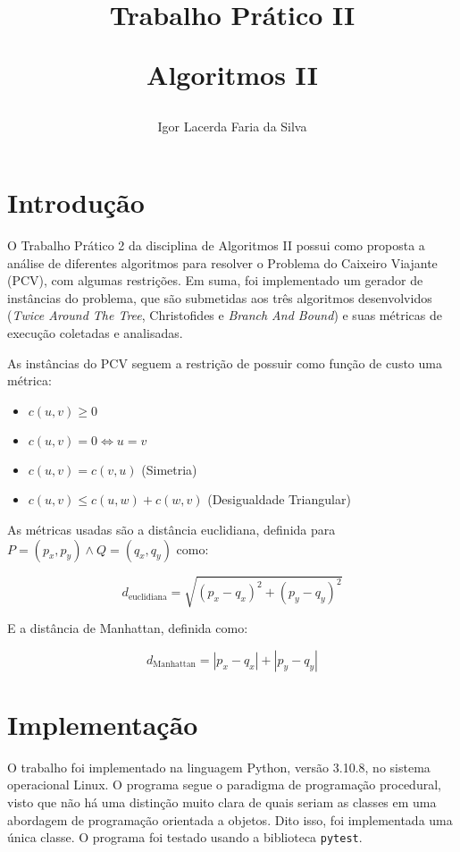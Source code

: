 \documentclass{article}
\author{Igor Lacerda Faria da Silva}
\title{Trabalho Prático II

Algoritmos II}
\date{}
\begin{document}
\maketitle

\section{Introdução}

O Trabalho Prático 2 da disciplina de Algoritmos II possui como proposta a análise de diferentes algoritmos para resolver o Problema do Caixeiro Viajante (PCV), com algumas restrições. Em suma, foi implementado um gerador de instâncias do problema, que são submetidas aos três algoritmos desenvolvidos (\textit{Twice Around The Tree}, Christofides e \textit{Branch And Bound}) e suas métricas de execução coletadas e analisadas.

As instâncias do PCV seguem a restrição de possuir como função de custo uma métrica:
\begin{itemize}

	\item \( c(u,v) \geq 0 \)

	\item \( c(u,v) = 0  \Leftrightarrow  u = v \)

	\item \( c(u,v) = c(v,u) \) (Simetria)

	\item \( c(u,v) \leq c(u,w) + c(w,v) \) (Desigualdade Triangular)

\end{itemize}

As métricas usadas são a distância euclidiana, definida para \( P = (p_x,p_y) \land Q=(q_x,q_y) \) como:

\[ d_{\textrm{euclidiana}} = \sqrt{ (p_x-q_x)^{2} + (p_y-q_y)^2 } \]

E a distância de Manhattan, definida como:

\[ d_{\textrm{Manhattan}} = | p_x - q_x | + | p_y - q_y | \]


\section{Implementação}

O trabalho foi implementado na linguagem Python, versão 3.10.8, no sistema operacional Linux. O programa segue o paradigma de programação procedural, visto que não há uma distinção muito clara de quais seriam as classes em uma abordagem de programação orientada a objetos. Dito isso, foi implementada uma única classe. O programa foi testado usando a biblioteca \texttt{pytest}.
\end{document}
